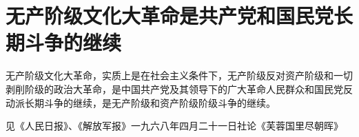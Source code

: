 \section[无产阶级文化大革命是共产党和国民党长期斗争的继续（一九六八年三月）]{无产阶级文化大革命是共产党和国民党长期斗争的继续}


无产阶级文化大革命，实质上是在社会主义条件下，无产阶级反对资产阶级和一切剥削阶级的政治大革命，是中国共产党及其领导下的广大革命人民群众和国民党反动派长期斗争的继续，是无产阶级和资产阶级阶级斗争的继续。

{\raggedleft 见《人民日报》、《解放军报》一九六八年四月二十一日社论《芙蓉国里尽朝晖》\par}


